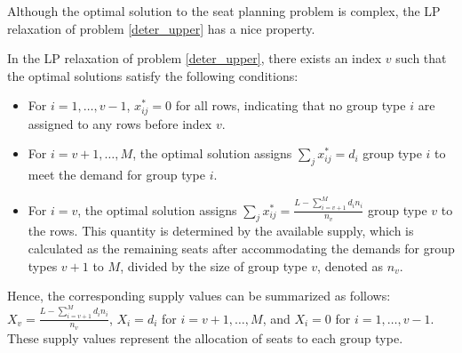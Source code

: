 

Although the optimal solution to the seat planning problem is complex, the LP relaxation of problem \eqref{deter_upper} has a nice property.

\begin{prop}\label{sol_relax_deter}
In the LP relaxation of problem \eqref{deter_upper}, there exists an index $v$ such that the optimal solutions satisfy the following conditions:

\begin{itemize}
  \item For $i = 1,\ldots, v-1$, $x_{ij}^{*} = 0$ for all rows, indicating that no group type $i$ are assigned to any rows before index $v$.
  \item For $i = v+1,\ldots, M$, the optimal solution assigns $\sum_{j} x_{ij}^{*} = d_{i}$ group type $i$ to meet the demand for group type $i$.
  \item For $i = v$, the optimal solution assigns $\sum_{j} x_{ij}^{*} = \frac{L - \sum_{i = v+1}^{M} {d_i n_i}}{n_v}$ group type $v$ to the rows. This quantity is determined by the available supply, which is calculated as the remaining seats after accommodating the demands for group types $v+1$ to $M$, divided by the size of group type $v$, denoted as $n_v$.
\end{itemize}

Hence, the corresponding supply values can be summarized as follows: $X_v = \frac{L - \sum_{i = v+1}^{M} {d_i n_i}}{n_v}$, $X_{i} = d_{i}$ for $i = v+1,\ldots, M$, and $X_{i} = 0$ for $i = 1, \ldots, v-1$. These supply values represent the allocation of seats to each group type.
\end{prop}



